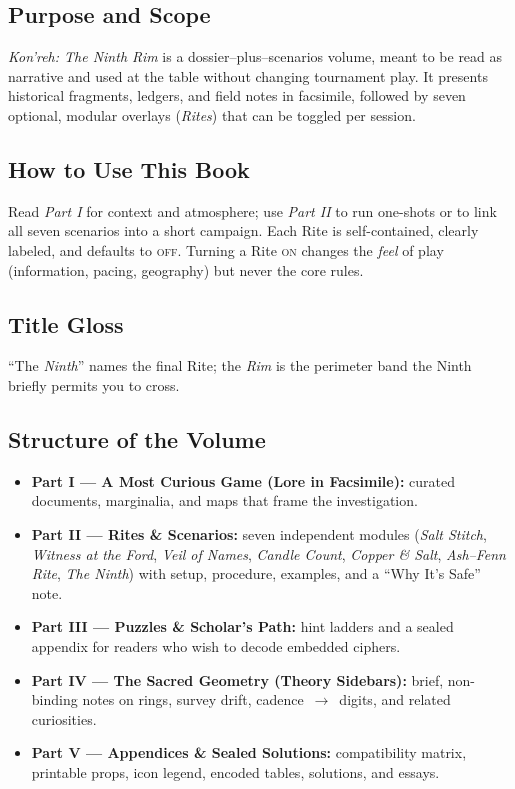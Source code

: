 \documentclass[11pt]{article}
\begin{document}
\subsection{Purpose and Scope}
\textit{Kon'reh: The Ninth Rim} is a dossier–plus–scenarios volume, meant to be read as narrative and used at the table without changing tournament play. It presents historical fragments, ledgers, and field notes in facsimile, followed by seven optional, modular overlays (\emph{Rites}) that can be toggled per session.

\subsection{How to Use This Book}
Read \emph{Part I} for context and atmosphere; use \emph{Part II} to run one-shots or to link all seven scenarios into a short campaign. Each Rite is self-contained, clearly labeled, and defaults to \textsc{off}. Turning a Rite \textsc{on} changes the \emph{feel} of play (information, pacing, geography) but never the core rules.

\subsection{Title Gloss}
“The \emph{Ninth}” names the final Rite; the \emph{Rim} is the perimeter band the Ninth briefly permits you to cross.

\subsection{Structure of the Volume}
\begin{itemize}
  \item \textbf{Part I — A Most Curious Game (Lore in Facsimile):} curated documents, marginalia, and maps that frame the investigation.
  \item \textbf{Part II — Rites \& Scenarios:} seven independent modules (\emph{Salt Stitch}, \emph{Witness at the Ford}, \emph{Veil of Names}, \emph{Candle Count}, \emph{Copper \& Salt}, \emph{Ash–Fenn Rite}, \emph{The Ninth}) with setup, procedure, examples, and a “Why It’s Safe” note.
  \item \textbf{Part III — Puzzles \& Scholar’s Path:} hint ladders and a sealed appendix for readers who wish to decode embedded ciphers.
  \item \textbf{Part IV — The Sacred Geometry (Theory Sidebars):} brief, non-binding notes on rings, survey drift, cadence~$\to$~digits, and related curiosities.
  \item \textbf{Part V — Appendices \& Sealed Solutions:} compatibility matrix, printable props, icon legend, encoded tables, solutions, and essays.
\end{itemize}
\end{document}
